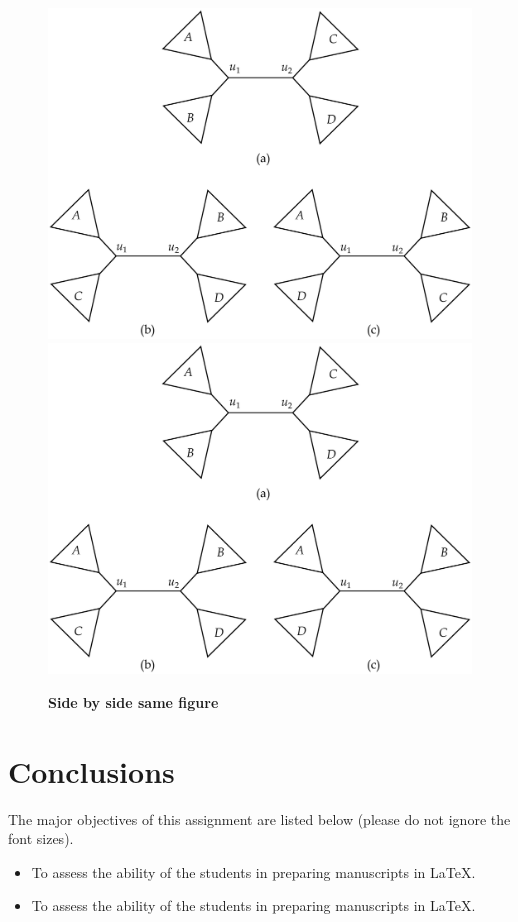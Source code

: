 \documentclass{article}
\begin{document}
\begin{figure}
    \centering
    \includegraphics[angle=90,width=0.4\linewidth]{Practice_Problem_4.pdf} 
    \includegraphics[angle=90,width=0.4\linewidth]{Practice_Problem_4.pdf}
    \caption{\textbf{Side by side same figure}}
    \label{fig:1}
\end{figure}



\newpage
\section{Conclusions}

The major objectives of this assignment are listed below (please do not ignore the font sizes).

\begin{itemize}
    \item \Large To assess the ability of the students in preparing manuscripts in \LaTeX.
    \item \large To assess the ability of the students in preparing manuscripts in \LaTeX.
\end{itemize}
\end{document}
